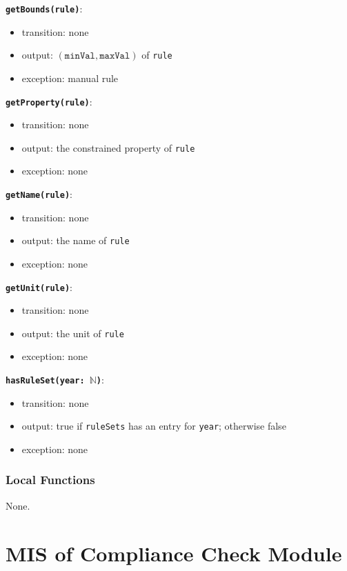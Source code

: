 \documentclass[12pt, titlepage]{article}
\begin{document}
\textbf{\texttt{getBounds(rule)}}:
\begin{itemize}
  \item transition: none
  \item output: $(\texttt{minVal}, \texttt{maxVal})$ of \texttt{rule}
  \item exception: manual rule
\end{itemize}

\textbf{\texttt{getProperty(rule)}}:
\begin{itemize}
  \item transition: none
  \item output: the constrained property of \texttt{rule}
  \item exception: none
\end{itemize}

\textbf{\texttt{getName(rule)}}:
\begin{itemize}
  \item transition: none
  \item output: the name of \texttt{rule}
  \item exception: none
\end{itemize}

\textbf{\texttt{getUnit(rule)}}:
\begin{itemize}
  \item transition: none
  \item output: the unit of \texttt{rule}
  \item exception: none
\end{itemize}

\textbf{\texttt{hasRuleSet(year: $\mathbb{N}$)}}:
\begin{itemize}
  \item transition: none
  \item output: true if \texttt{ruleSets} has an entry for \texttt{year}; otherwise false
  \item exception: none
\end{itemize}

\subsubsection{Local Functions}
None.

\newpage

\section{MIS of Compliance Check Module} \label{mCompliance}
\end{document}

